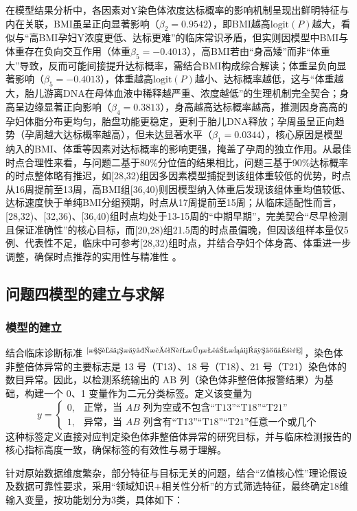 \documentclass[withoutpreface,bwprint]{cumcmthesis} %
\begin{document}
在模型结果分析中，各因素对Y染色体浓度达标概率的影响机制呈现出鲜明特征与内在关联，BMI虽呈正向显著影响（$\beta_2=0.9542$），即BMI越高$\text{logit}(P)$越大，看似与“高BMI孕妇Y浓度更低、达标更难”的临床常识矛盾，但实则因模型中BMI与体重存在负向交互作用（体重$\beta_5=-0.4013$），高BMI若由“身高矮”而非“体重大”导致，反而可能间接提升达标概率，需结合BMI构成综合解读；体重呈负向显著影响（$\beta_5=-0.4013$），体重越高$\text{logit}(P)$越小、达标概率越低，这与“体重越大，胎儿游离DNA在母体血液中稀释越严重、浓度越低”的生理机制完全契合；身高呈边缘显著正向影响（$\beta_4=0.3813$），身高越高达标概率越高，推测因身高高的孕妇体脂分布更均匀，胎盘功能更稳定，更利于胎儿DNA释放；孕周虽呈正向趋势（孕周越大达标概率越高），但未达显著水平（$\beta_1=0.0344$），核心原因是模型纳入的BMI、体重等因素对达标概率的影响更强，掩盖了孕周的独立作用。从最佳时点合理性来看，与问题二基于80\%分位值的结果相比，问题三基于90\%达标概率的时点整体略有推迟，如[28,32)组因多因素模型捕捉到该组体重较低的优势，时点从16周提前至13周，高BMI组[36,40)则因模型纳入体重后发现该组体重均值较低、达标速度快于单纯BMI分组预期，时点从17周提前至15周；从临床适配性而言，[28,32)、[32,36)、[36,40)组时点均处于13-15周的“中期早期”，完美契合“尽早检测且保证准确性”的核心目标，而[20,28)组21.5周的时点虽偏晚，但因该组样本量仅5例、代表性不足，临床中可参考[28,32)组时点，并结合孕妇个体身高、体重进一步调整，确保时点推荐的实用性与精准性 。


\subsection{问题四模型的建立与求解}

\subsubsection{模型的建立}

结合临床诊断标准 $^\text{\cite{染色体核型检验诊断报告模式专家共识}}$，染色体非整倍体异常的主要标志是 13 号（T13）、18 号（T18）、21 号（T21）染色体的数目异常。因此，以检测系统输出的 AB 列（染色体非整倍体报警结果）为基础，构建一个 0、1 变量作为二元分类标签。定义该变量为
\[
y = 
\begin{cases} 
0, & \text{正常，当 } AB \text{ 列为空或不包含“T13”“T18”“T21”} \\
1, & \text{异常，当 } AB \text{ 列含有“T13”“T18”“T21”任意一个或几个}
\end{cases}
\]
这种标签定义直接对应判定染色体非整倍体异常的研究目标，并与临床检测报告的核心指标高度一致，确保标签的有效性与易于理解。

针对原始数据维度繁杂，部分特征与目标无关的问题，结合“Z值核心性”理论假设及数据可靠性要求，采用“领域知识+相关性分析”的方式筛选特征，最终确定18维输入变量，按功能划分为3类，具体如下：  
\end{document}
